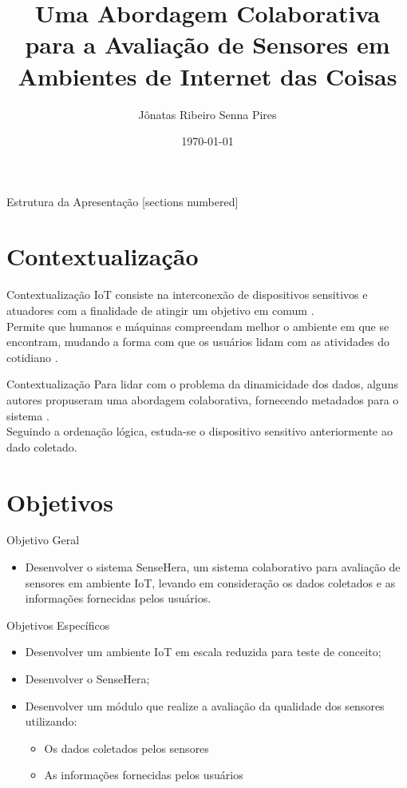 \documentclass{beamer}
\title{Uma Abordagem Colaborativa para a Avaliação de Sensores em Ambientes de Internet das Coisas}
\date{\today}
\author{Jônatas Ribeiro Senna Pires}
\institute{Universidade de Brasília}
\begin{document}
  \maketitle

  \begin{frame}{Estrutura da Apresentação}
    [sections numbered]
    \tableofcontents[hideallsubsections]
  \end{frame}

  \section{Contextualização}
    \begin{frame}{Contextualização}
      \quad IoT consiste na interconexão de dispositivos sensitivos e atuadores com a finalidade de atingir um objetivo em comum \cite{giusto}.
      \\\null \quad Permite que humanos e máquinas compreendam melhor o ambiente em que se encontram, mudando a forma com que os usuários lidam com as atividades do cotidiano \cite{IOTS}.
    \end{frame}
    \begin{frame}{Contextualização}
      \quad Para lidar com o problema da dinamicidade dos dados, alguns autores propuseram uma abordagem colaborativa, fornecendo metadados para o sistema \cite{collaborative}.
      \\\null \quad Seguindo a ordenação lógica, estuda-se o dispositivo sensitivo anteriormente ao dado coletado.
    \end{frame}

  \section{Objetivos}
    \begin{frame}{Objetivo Geral}
          \begin{itemize}
            \item Desenvolver o sistema SenseHera, um sistema colaborativo para avaliação de sensores em ambiente IoT, levando em consideração os dados coletados e as informações fornecidas pelos usuários.
          \end{itemize}
    \end{frame}

    \begin{frame}{Objetivos Específicos}
      \begin{itemize}
          \item Desenvolver um ambiente IoT em escala reduzida para teste de conceito;
          \item Desenvolver o SenseHera;
          \item Desenvolver um módulo que realize a avaliação da qualidade dos sensores utilizando:
            \begin{itemize}
              \item Os dados coletados pelos sensores
              \item As informações fornecidas pelos usuários
            \end{itemize}
      \end{itemize}
    \end{frame}
\end{document}
